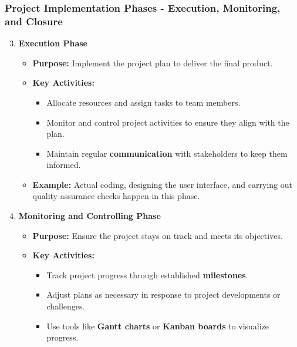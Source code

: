 \documentclass[aspectratio=169]{beamer}
\begin{document}
\begin{frame}[fragile]
    \frametitle{Project Implementation Phases - Execution, Monitoring, and Closure}
    \begin{enumerate}
        \setcounter{enumi}{2}
        \item \textbf{Execution Phase}
            \begin{itemize}
                \item \textbf{Purpose:} Implement the project plan to deliver the final product.
                \item \textbf{Key Activities:}
                    \begin{itemize}
                        \item Allocate resources and assign tasks to team members.
                        \item Monitor and control project activities to ensure they align with the plan.
                        \item Maintain regular \textbf{communication} with stakeholders to keep them informed.
                    \end{itemize}
                \item \textbf{Example:} Actual coding, designing the user interface, and carrying out quality assurance checks happen in this phase.
            \end{itemize}
            
        \item \textbf{Monitoring and Controlling Phase}
            \begin{itemize}
                \item \textbf{Purpose:} Ensure the project stays on track and meets its objectives.
                \item \textbf{Key Activities:}
                    \begin{itemize}
                        \item Track project progress through established \textbf{milestones}.
                        \item Adjust plans as necessary in response to project developments or challenges.
                        \item Use tools like \textbf{Gantt charts} or \textbf{Kanban boards} to visualize progress.
                    \end{itemize}
            \end{itemize}
            

\end{enumerate}
\end{frame}
\end{document}
